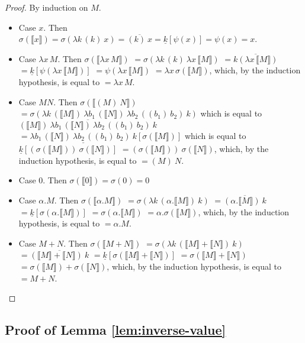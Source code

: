 \documentclass{LMCS}
\newcommand{\wt}[1]{\llbracket{#1}\rrbracket}
\begin{document}
\begin{proof}
  By induction on $M$.
  \begin{itemize}
    \item Case $x$. Then $\sigma(\wt x)=\sigma(\lambda k\,(k)~x)=\overline{(k)~x}=\underline{k}[\psi(x)]=\psi(x)=x$.
    \item Case $\lambda x\,M$. Then 
      $\sigma(\wt{\lambda x\,M})$
      $=\sigma(\lambda k\,(k)~\lambda x\,\wt M)$
      $=\overline{k(\lambda x\,\wt M)}$
      $=\underline{k}[\psi(\lambda x\,\wt M)]$
      $=\psi(\lambda x\,\wt M)$
      $=\lambda x\,\sigma(\wt M)$,
      which, by the induction hypothesis, is equal to
      $=\lambda x\,M$.

    \item Case $MN$. Then 
      $\sigma(\wt{(M)~N})$
      $=\sigma(\lambda k\,(\wt M)~\lambda b_{1}\,(\wt N)~\lambda b_{2}\,((b_{1})~b_{2})~k)$
      which is equal to
      $\overline{(\wt M)~\lambda b_{1}\,(\wt N)~\lambda b_{2}\,((b_{1})~b_{2})~k}$
      $=\underline{\lambda b_{1}\,(\wt N)~\lambda b_{2}\,((b_{1})~b_{2})~k}[\sigma(\wt M)]$
      which is equal to
      $\underline{k}[(\sigma(\wt M))~\sigma(\wt N)]$
      $=(\sigma(\wt M))~\sigma(\wt N)$,
      which, by the induction hypothesis, is equal to
      $=(M)~N$.

    \item Case $0$. Then $\sigma(\wt 0)=\sigma(0)=0$
    \item Case $\alpha.M$. Then 
      $\sigma(\wt{\alpha.M})$
      $=\sigma(\lambda k\,(\alpha.\wt M)~k)$
      $=\overline{(\alpha.\wt M)~k}$
      $=\underline{k}[\sigma(\alpha.\wt M)]$
      $=\sigma(\alpha.\wt M)$
      $=\alpha.\sigma(\wt M)$,
      which, by the induction hypothesis, is equal to
      $=\alpha.M$.

    \item Case $M+N$. Then
      $\sigma(\wt{M+N})$
      $=\sigma(\lambda k\,(\wt M+\wt N)~k)$
      $=\overline{(\wt M+\wt N)~k}$
      $=\underline{k}[\sigma(\wt M+\wt N)]$
      $=\sigma(\wt M+\wt N)$
      $=\sigma(\wt M)+\sigma(\wt N)$,
      which, by the induction hypothesis, is equal to
      $=M+N$.
      \qedhere
  \end{itemize}
\end{proof}

\subsection{Proof of Lemma \ref{lem:inverse-value}}\label{proof:inverse-value}~
\end{document}
